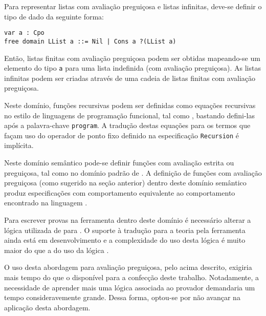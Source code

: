 Para representar listas com avaliação preguiçosa e listas infinitas, deve-se definir o tipo de dado da seguinte forma:

\begin{Verbatim}
var a : Cpo
free domain LList a ::= Nil | Cons a ?(LList a)
\end{Verbatim}

Então, listas finitas com avaliação preguiçosa podem ser obtidas mapeando-se um elemento do tipo \Verb.a. para uma lista indefinida (com avaliação preguiçosa).
As listas infinitas podem ser criadas através de uma cadeia de listas finitas com avaliação preguiçosa.

Neste domínio, funções recursivas podem ser definidas como equações recursivas no estilo de linguagens de programação funcional, tal como \Haskell, bastando defini-las após a palavra-chave \Verb.program..
A tradução destas equações para os termos que façam uso do operador de ponto fixo definido na especificação \Verb.Recursion. é implícita.

Neste domínio semântico pode-se definir funções com avaliação estrita ou preguiçosa, tal como no domínio padrão de \HasCASL.
A definição de funções com avaliação preguiçosa (como sugerido na seção anterior) dentro deste domínio semântico produz especificações com comportamento equivalente ao comportamento encontrado na linguagem \Haskell.

Para escrever provas na ferramenta \Isabelle dentro deste domínio é necessário alterar a lógica utilizada de \HOL para \HOLCF.
O suporte à tradução para a teoria \HOLCF pela ferramenta \Hets ainda está em desenvolvimento e a complexidade do uso desta lógica é muito maior do que a do uso da lógica \HOL.

O uso desta abordagem para avaliação preguiçosa, pelo acima descrito, exigiria mais tempo do que o disponível para a confecção deste trabalho.
Notadamente, a necessidade de aprender mais uma lógica associada ao provador \Isabelle demandaria um tempo consideravemente grande.
Dessa forma, optou-se por não avançar na aplicação desta abordagem.